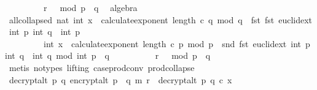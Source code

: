 \begin{isabellebody}
\ \ \ \ \ \ \ \ \ r\ {\isacharcircum}{\kern0pt}\ {}\ mod\ {\isacharparenleft}{\kern0pt}p\ {\isacharasterisk}{\kern0pt}\ q{\isacharparenright}{\kern0pt}{\isachardoublequoteclose}\ \isamarkupfalse%
\ algebra\isanewline
\isanewline
\ \ \isamarkupfalse%
\ \isamarkupfalse%
\ all{\isacharunderscore}{\kern0pt}collapsed{\isacharcolon}{\kern0pt}\ {\isachardoublequoteopen}nat\ {\isacharparenleft}{\kern0pt}{\isacharparenleft}{\kern0pt}int\ {\isacharparenleft}{\kern0pt}x\ {\isacharcircum}{\kern0pt}\ calculate{\isacharunderscore}{\kern0pt}exponent\ {\isacharparenleft}{\kern0pt}length\ c{\isacharparenright}{\kern0pt}\ q\ mod\ q{\isacharparenright}{\kern0pt}\ {\isacharasterisk}{\kern0pt}\ fst\ {\isacharparenleft}{\kern0pt}fst\ {\isacharparenleft}{\kern0pt}euclid{\isacharunderscore}{\kern0pt}ext\ {\isacharparenleft}{\kern0pt}int\ p{\isacharparenright}{\kern0pt}\ {\isacharparenleft}{\kern0pt}int\ q{\isacharparenright}{\kern0pt}{\isacharparenright}{\kern0pt}{\isacharparenright}{\kern0pt}\ {\isacharasterisk}{\kern0pt}\ int\ p\ \isanewline
\ \ \ \ \ \ \ \ {\isacharplus}{\kern0pt}\ int\ {\isacharparenleft}{\kern0pt}x\ {\isacharcircum}{\kern0pt}\ calculate{\isacharunderscore}{\kern0pt}exponent\ {\isacharparenleft}{\kern0pt}length\ c{\isacharparenright}{\kern0pt}\ p\ mod\ p{\isacharparenright}{\kern0pt}\ {\isacharasterisk}{\kern0pt}\ snd\ {\isacharparenleft}{\kern0pt}fst\ {\isacharparenleft}{\kern0pt}euclid{\isacharunderscore}{\kern0pt}ext\ {\isacharparenleft}{\kern0pt}int\ p{\isacharparenright}{\kern0pt}\ {\isacharparenleft}{\kern0pt}int\ q{\isacharparenright}{\kern0pt}{\isacharparenright}{\kern0pt}{\isacharparenright}{\kern0pt}\ {\isacharasterisk}{\kern0pt}\ int\ q{\isacharparenright}{\kern0pt}\ mod\ int\ {\isacharparenleft}{\kern0pt}p\ {\isacharasterisk}{\kern0pt}\ q{\isacharparenright}{\kern0pt}{\isacharparenright}{\kern0pt}\ {\isacharequal}{\kern0pt}\isanewline
\ \ \ \ \ \ \ \ \ r\ {\isacharcircum}{\kern0pt}\ {}\ mod\ {\isacharparenleft}{\kern0pt}p\ {\isacharasterisk}{\kern0pt}\ q{\isacharparenright}{\kern0pt}\ {\isachardoublequoteclose}\ \isanewline
\ \ \ \ \isamarkupfalse%
\ {\isacharparenleft}{\kern0pt}metis\ {\isacharparenleft}{\kern0pt}no{\isacharunderscore}{\kern0pt}types{\isacharcomma}{\kern0pt}\ lifting{\isacharparenright}{\kern0pt}\ case{\isacharunderscore}{\kern0pt}prod{\isacharunderscore}{\kern0pt}conv\ prod{\isachardot}{\kern0pt}collapse{\isacharparenright}{\kern0pt}\isanewline
\isanewline
\isanewline
\ \ \isamarkupfalse%
\ {\isachardoublequoteopen}decrypt{\isacharunderscore}{\kern0pt}alt\ p\ q\ {\isacharparenleft}{\kern0pt}encrypt{\isacharunderscore}{\kern0pt}alt\ {\isacharparenleft}{\kern0pt}p\ {\isacharasterisk}{\kern0pt}\ q{\isacharparenright}{\kern0pt}\ m\ r{\isacharparenright}{\kern0pt}\ {\isacharequal}{\kern0pt}\ decrypt{\isacharunderscore}{\kern0pt}alt\ p\ q\ {\isacharparenleft}{\kern0pt}c{\isacharcomma}{\kern0pt}\ x{\isacharparenright}{\kern0pt}{\isachardoublequoteclose}\isanewline

\end{isabellebody}
